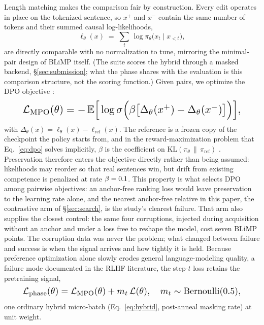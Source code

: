 Length matching makes the comparison fair by construction. Every edit
operates in place on the tokenized sentence, so $x^{+}$ and $x^{-}$ contain
the same number of tokens and their summed causal log-likelihoods,
\begin{equation}
\label{eq:seqll}
\ell_\theta(x) \;=\; \textstyle\sum_{t}\, \log \pi_\theta\!\big(x_t \mid x_{<t}\big),
\end{equation}
are directly comparable with no normalization to tune, mirroring the
minimal-pair design of BLiMP itself. (The suite scores the hybrid through
a masked backend, \S\ref{sec:submission}; what the phase shares with the
evaluation is this comparison structure, not the scoring function.) Given
pairs, we optimize the DPO objective \citep[cf.][]{rafailov2023dpo}:
\begin{equation}
\label{eq:dpo}
\resizebox{0.89\columnwidth}{!}{$
\mathcal{L}_{\text{\MPO{}}}(\theta) = -\,\mathbb{E}\Big[\log \sigma\Big(\beta\big[\Delta_\theta(x^{+}) - \Delta_\theta(x^{-})\big]\Big)\Big],
$}
\end{equation}
with $\Delta_\theta(x) = \ell_\theta(x) - \ell_{\text{ref}}(x)$. The
reference is a frozen copy of the checkpoint the policy starts from, and in
the reward-maximization problem that Eq.~\ref{eq:dpo} solves implicitly,
$\beta$ is the coefficient on $\mathrm{KL}(\pi_\theta \,\|\, \pi_{\text{ref}})$
\citep{rafailov2023dpo}. Preservation therefore enters the objective
directly rather than being assumed: likelihoods may reorder so that real
sentences win, but drift
from existing competence is penalized at rate $\beta=0.1$. This
property is what selects DPO among pairwise objectives: an anchor-free
ranking loss would leave preservation to the learning rate alone, and the
nearest anchor-free relative in this paper, the contrastive arm of
\S\ref{sec:search}, is the study's clearest failure. That arm also
supplies the closest control: the same four corruptions, injected during
acquisition without an anchor and under a loss free to reshape the model,
cost seven BLiMP points. The corruption data was never the problem; what
changed between failure and success is when the signal arrives and how
tightly it is held. Because preference
optimization alone slowly erodes general language-modeling quality, a failure
mode documented in the RLHF literature, the step-$t$ loss retains the
pretraining signal,
\begin{equation}
\label{eq:phase}
\resizebox{0.89\columnwidth}{!}{$
\mathcal{L}_{\text{phase}}(\theta) = \mathcal{L}_{\text{\MPO{}}}(\theta) + m_t\,\mathcal{L}(\theta),
\quad m_t \sim \mathrm{Bernoulli}(0.5),
$}
\end{equation}
one ordinary hybrid micro-batch (Eq.~\ref{eq:hybrid}, post-anneal
masking rate) at unit weight.

